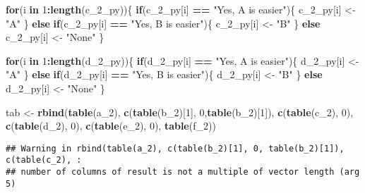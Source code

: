 \documentclass[
]{article}
\newenvironment{Shaded}{\begin{snugshade}}{\end{snugshade}}
\newcommand{\ControlFlowTok}[1]{\textcolor[rgb]{0.13,0.29,0.53}{\textbf{#1}}}
\newcommand{\DecValTok}[1]{\textcolor[rgb]{0.00,0.00,0.81}{#1}}
\newcommand{\KeywordTok}[1]{\textcolor[rgb]{0.13,0.29,0.53}{\textbf{#1}}}
\newcommand{\NormalTok}[1]{#1}
\newcommand{\OperatorTok}[1]{\textcolor[rgb]{0.81,0.36,0.00}{\textbf{#1}}}
\newcommand{\StringTok}[1]{\textcolor[rgb]{0.31,0.60,0.02}{#1}}
\begin{document}
\begin{Shaded}
\begin{Highlighting}[]
\ControlFlowTok{for}\NormalTok{(i }\ControlFlowTok{in} \DecValTok{1}\OperatorTok{:}\KeywordTok{length}\NormalTok{(c_}\DecValTok{2}\NormalTok{_py))\{}
  \ControlFlowTok{if}\NormalTok{(c_}\DecValTok{2}\NormalTok{_py[i] }\OperatorTok{==}\StringTok{ "Yes, A is easier"}\NormalTok{)\{}
\NormalTok{    c_}\DecValTok{2}\NormalTok{_py[i] <-}\StringTok{ "A"}
\NormalTok{  \} }\ControlFlowTok{else} \ControlFlowTok{if}\NormalTok{(c_}\DecValTok{2}\NormalTok{_py[i] }\OperatorTok{==}\StringTok{ "Yes, B is easier"}\NormalTok{)\{ }
\NormalTok{    c_}\DecValTok{2}\NormalTok{_py[i] <-}\StringTok{ "B"}
\NormalTok{  \} }\ControlFlowTok{else}\NormalTok{ c_}\DecValTok{2}\NormalTok{_py[i] <-}\StringTok{ "None"}
\NormalTok{\}}

\ControlFlowTok{for}\NormalTok{(i }\ControlFlowTok{in} \DecValTok{1}\OperatorTok{:}\KeywordTok{length}\NormalTok{(d_}\DecValTok{2}\NormalTok{_py))\{}
  \ControlFlowTok{if}\NormalTok{(d_}\DecValTok{2}\NormalTok{_py[i] }\OperatorTok{==}\StringTok{ "Yes, A is easier"}\NormalTok{)\{}
\NormalTok{    d_}\DecValTok{2}\NormalTok{_py[i] <-}\StringTok{ "A"}
\NormalTok{  \} }\ControlFlowTok{else} \ControlFlowTok{if}\NormalTok{(d_}\DecValTok{2}\NormalTok{_py[i] }\OperatorTok{==}\StringTok{ "Yes, B is easier"}\NormalTok{)\{ }
\NormalTok{    d_}\DecValTok{2}\NormalTok{_py[i] <-}\StringTok{ "B"}
\NormalTok{  \} }\ControlFlowTok{else}\NormalTok{ d_}\DecValTok{2}\NormalTok{_py[i] <-}\StringTok{ "None"}
\NormalTok{\}}


\NormalTok{tab <-}\StringTok{ }\KeywordTok{rbind}\NormalTok{(}\KeywordTok{table}\NormalTok{(a_}\DecValTok{2}\NormalTok{), }\KeywordTok{c}\NormalTok{(}\KeywordTok{table}\NormalTok{(b_}\DecValTok{2}\NormalTok{)[}\DecValTok{1}\NormalTok{], }\DecValTok{0}\NormalTok{,}\KeywordTok{table}\NormalTok{(b_}\DecValTok{2}\NormalTok{)[}\DecValTok{1}\NormalTok{]), }\KeywordTok{c}\NormalTok{(}\KeywordTok{table}\NormalTok{(c_}\DecValTok{2}\NormalTok{), }\DecValTok{0}\NormalTok{), }\KeywordTok{c}\NormalTok{(}\KeywordTok{table}\NormalTok{(d_}\DecValTok{2}\NormalTok{), }\DecValTok{0}\NormalTok{), }\KeywordTok{c}\NormalTok{(}\KeywordTok{table}\NormalTok{(e_}\DecValTok{2}\NormalTok{), }\DecValTok{0}\NormalTok{), }\KeywordTok{table}\NormalTok{(f_}\DecValTok{2}\NormalTok{))}
\end{Highlighting}
\end{Shaded}

\begin{verbatim}
## Warning in rbind(table(a_2), c(table(b_2)[1], 0, table(b_2)[1]), c(table(c_2), :
## number of columns of result is not a multiple of vector length (arg 5)
\end{verbatim}
\end{document}
